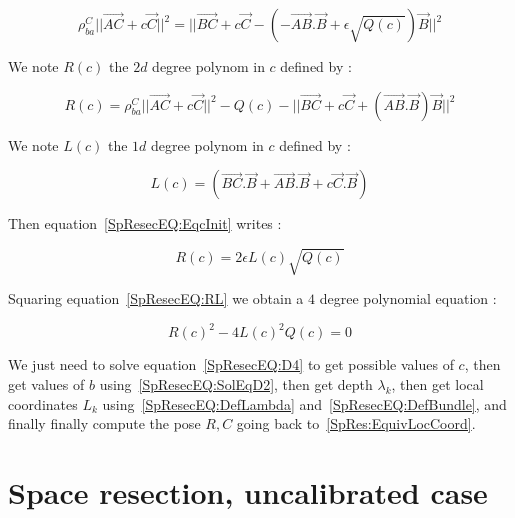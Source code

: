 \begin{equation}
	\rho^C_{ba}   ||\overrightarrow{AC}  + c \Vec{C}||^2
	= || \overrightarrow{BC} + c \Vec{C} -  (-\overrightarrow{AB}. \Vec{B} + \epsilon \sqrt{Q(c)}) \Vec{B} ||^2 
	\label{SpResecEQ:EqcInit}
\end{equation}

We note $R(c)$ the $2d$ degree polynom in $c$ defined by :

\begin{equation}
   R(c) =   \rho^C_{ba}   ||\overrightarrow{AC}  + c \Vec{C}||^2
        - Q(c)
        - ||\overrightarrow{BC} + c \Vec{C} + (\overrightarrow{AB}. \Vec{B}) \Vec{B} ||^2
\end{equation}

We note $L(c)$ the $1d$ degree polynom in $c$ defined by :

\begin{equation}
	L(c)=   ( \overrightarrow{BC}.\Vec{B} + \overrightarrow{AB}. \Vec{B} +   c \Vec{C}.\Vec{B}  ) 
\end{equation}

Then equation~\ref{SpResecEQ:EqcInit} writes :

\begin{equation}
	R(c) = 2 \epsilon L(c)  \sqrt{Q(c) }   \label{SpResecEQ:RL}
\end{equation}

Squaring equation~\ref{SpResecEQ:RL} we obtain a $4$ degree polynomial equation :

\begin{equation}
	R(c) ^2 - 4 L(c)^2  Q(c) = 0   \label{SpResecEQ:D4}
\end{equation}

We just need to solve equation~\ref{SpResecEQ:D4} to get possible values of $c$, 
then get values of $b$ using~\ref{SpResecEQ:SolEqD2}, 
then get depth $\lambda _k$, then get local coordinates $L_k$ using~\ref{SpResecEQ:DefLambda} 
and~\ref{SpResecEQ:DefBundle}, and finally finally compute the pose $R,C$  going back to~\ref{SpRes:EquivLocCoord}.


\section{Space resection, uncalibrated case}


